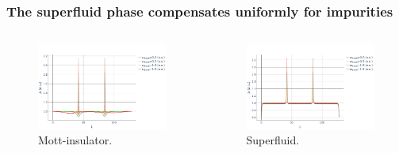 \documentclass[aspectratio=169]{beamer}
\begin{document}
\begin{frame}
  \frametitle{The superfluid phase compensates uniformly for impurities}
  \begin{columns}[onlytextwidth]
    \begin{column}{0.5\textwidth}
      \begin{figure}[ht]
        \centering
        \includegraphics[scale=0.2]{../img/Density-profiles-MI.pdf}
        \caption*{Mott-insulator.}
      \end{figure}
    \end{column}
    \begin{column}{0.5\textwidth}
      \begin{figure}[ht]
        \centering
        \includegraphics[scale=0.2]{../img/Density-profiles-SF.pdf}
        \caption*{Superfluid.}
      \end{figure}
    \end{column}
  \end{columns}
\end{frame}
\end{document}
